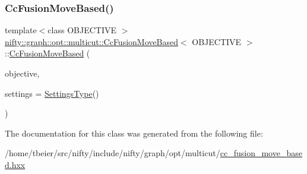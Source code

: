 \mbox{\label{classnifty_1_1graph_1_1opt_1_1multicut_1_1CcFusionMoveBased_aee1e025e2a17e534a1fda9e8c3848f71}} 
\subsubsection{\texorpdfstring{Cc\+Fusion\+Move\+Based()}{CcFusionMoveBased()}}
{\footnotesize\ttfamily template$<$class O\+B\+J\+E\+C\+T\+I\+VE $>$ \\
\hyperlink{classnifty_1_1graph_1_1opt_1_1multicut_1_1CcFusionMoveBased}{nifty\+::graph\+::opt\+::multicut\+::\+Cc\+Fusion\+Move\+Based}$<$ O\+B\+J\+E\+C\+T\+I\+VE $>$\+::\hyperlink{classnifty_1_1graph_1_1opt_1_1multicut_1_1CcFusionMoveBased}{Cc\+Fusion\+Move\+Based} (\begin{DoxyParamCaption}\item[{const \hyperlink{classnifty_1_1graph_1_1opt_1_1multicut_1_1CcFusionMoveBased_a36f47f4066a3a686514ed6a505608345}{Objective\+Type} \&}]{objective,  }\item[{const \hyperlink{classnifty_1_1graph_1_1opt_1_1multicut_1_1CcFusionMoveBased_a0e5269b8e826a05c6999a3f82ca4fc55}{Settings\+Type} \&}]{settings = {\ttfamily \hyperlink{classnifty_1_1graph_1_1opt_1_1multicut_1_1CcFusionMoveBased_a0e5269b8e826a05c6999a3f82ca4fc55}{Settings\+Type}()} }\end{DoxyParamCaption})\hspace{0.3cm}{\ttfamily [inline]}}



The documentation for this class was generated from the following file\+:\begin{DoxyCompactItemize}
\item 
/home/tbeier/src/nifty/include/nifty/graph/opt/multicut/\hyperlink{cc__fusion__move__based_8hxx}{cc\+\_\+fusion\+\_\+move\+\_\+based.\+hxx}\end{DoxyCompactItemize}
